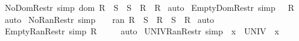 \begin{isabellebody}
\ No{\isacharunderscore}Dom{\isacharunderscore}Restr\ {\isacharbrackleft}simp{\isacharbrackright}{\isacharcolon}\ {\isachardoublequoteopen}{\isacharparenleft}dom\ R\ {\isacharless}{\isacharequal}\ S{\isacharparenright}\ {\isacharequal}\ {\isacharparenleft}S\ {\isacharless}{\isacharcolon}\ R\ {\isacharequal}\ R{\isacharparenright}{\isachardoublequoteclose}\isanewline
%
\isadelimproof
\isanewline
%
\endisadelimproof
%
\isatagproof
{}\isamarkupfalse%
\ auto\isanewline
{}\isamarkupfalse%
%
\endisatagproof
{\isafoldproof}%
%
\isadelimproof
\isanewline
%
\endisadelimproof
\isanewline
{}\isamarkupfalse%
\ Empty{\isacharunderscore}Dom{\isacharunderscore}Restr\ {\isacharbrackleft}simp{\isacharbrackright}{\isacharcolon}\ {\isachardoublequoteopen}{\isacharbraceleft}{\isacharbraceright}\ {\isacharless}{\isacharcolon}\ R\ {\isacharequal}\ {\isacharbraceleft}{\isacharbraceright}{\isachardoublequoteclose}\isanewline
%
\isadelimproof
%
\endisadelimproof
%
\isatagproof
{}\isamarkupfalse%
\ auto\isanewline
{}\isamarkupfalse%
%
\endisatagproof
{\isafoldproof}%
%
\isadelimproof
\isanewline
%
\endisadelimproof
\isanewline
{}\isamarkupfalse%
\ No{\isacharunderscore}Ran{\isacharunderscore}Restr\ {\isacharbrackleft}simp{\isacharbrackright}{\isacharcolon}\ \ \ \ {\isachardoublequoteopen}{\isacharparenleft}ran\ R\ {\isacharless}{\isacharequal}\ S{\isacharparenright}\ {\isacharequal}\ {\isacharparenleft}R\ {\isacharcolon}{\isachargreater}\ S\ {\isacharequal}\ R{\isacharparenright}{\isachardoublequoteclose}\isanewline
%
\isadelimproof
\isanewline
%
\endisadelimproof
%
\isatagproof
{}\isamarkupfalse%
\ auto\isanewline
{}\isamarkupfalse%
%
\endisatagproof
{\isafoldproof}%
%
\isadelimproof
\isanewline
%
\endisadelimproof
\isanewline
{}\isamarkupfalse%
\ Empty{\isacharunderscore}Ran{\isacharunderscore}Restr\ {\isacharbrackleft}simp{\isacharbrackright}{\isacharcolon}\ {\isachardoublequoteopen}R\ {\isacharcolon}{\isachargreater}\ {\isacharbraceleft}{\isacharbraceright}\ {\isacharequal}\ {\isacharbraceleft}{\isacharbraceright}{\isachardoublequoteclose}\isanewline
%
\isadelimproof
%
\endisadelimproof
%
\isatagproof
{}\isamarkupfalse%
\ auto\isanewline
{}\isamarkupfalse%
%
\endisatagproof
{\isafoldproof}%
%
\isadelimproof
\isanewline
%
\endisadelimproof
\isanewline
\isanewline
{}\isamarkupfalse%
\ UNIV{\isacharunderscore}Ran{\isacharunderscore}Restr\ {\isacharbrackleft}simp{\isacharbrackright}{\isacharcolon}\ \ {\isachardoublequoteopen}x\ {\isacharcolon}{\isachargreater}\ UNIV\ {\isacharequal}\ x{\isachardoublequoteclose}\isanewline

\end{isabellebody}
